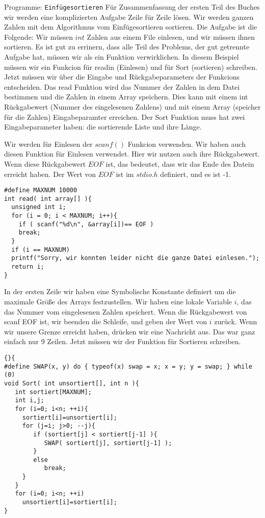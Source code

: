 \begin{myexampleprogram}{ Programme: \texttt{Einfügesortieren}}
Für Zusammenfassung der ersten Teil des Buches wir werden eine komplizierten Aufgabe Zeile für Zeile lösen.
Wir werden ganzen Zahlen mit dem Algorithmus vom Einfügesortieren sortieren. Die Aufgabe ist die Folgende:
Wir müssen $int$ Zahlen aus einem File einlesen, und wir müssen ihnen sortieren. Es ist gut zu errinern, 
dass alle Teil des Problems, der gut getrennte Aufgabe hat, müssen wir als ein Funktion verwirklichen.
In diesem Beispiel müssen wir ein Funkcion für readin (Einlesen) und für Sort (sortieren) schreiben.
Jetzt müssen wir über die Eingabe und Rückgabeparameters der Funkcions entscheiden.
Das read Funktion wird das Nummer der Zahlen in dem Datei bestimmen und die Zahlen in einem Array
speichern. Dies kann mit einem int Rückgabewert (Nummer des eingelesenen Zahlens) und mit einem Array
(speicher für die Zahlen) Eingabeparamter erreichen. Der Sort Funktion muss hat zwei Eingabeparameter haben:
die sortierende Liste und ihre Länge.

Wir werden für Einlesen der $scanf()$ Funkcion verwenden. Wir haben auch diesen Funktion für 
Einlesen verwendet. Hier wir nutzen auch ihre Rückgabewert. Wenn diese Rückgabewert $EOF$ ist, 
das bedeutet, dass wir das Ende des Datein erreicht haben. Der Wert von $EOF$ ist im $stdio.h$ definiert, 
und es ist -1.
\begin{lstlisting}
#define MAXNUM 10000
int read( int array[] ){
  unsigned int i;
  for (i = 0; i < MAXNUM; i++){
    if ( scanf("%d\n", &array[i])== EOF )
    break;
  }
  if (i == MAXNUM)
  printf("Sorry, wir konnten leider nicht die ganze Datei einlesen.");
  return i;
}
\end{lstlisting} 
In der ersten Zeile wir haben eine Symbolische Konstante definiert um die maximale Größe des
Arrays festzustellen. Wir haben eine lokale Variable $i$, das das Nummer vom eingelesenen Zahlen speichert.
Wenn die Rückgabewert von scanf EOF ist, wir beenden die Schleife, und geben der Wert von $i$ zurück.
Wenn wir unsere Grenze erreicht haben, drücken wir eine Nachricht aus.
Das war ganz einfach nur 9 Zeilen. Jetzt müssen wir der Funktion für Sortieren schreiben.
\begin{lstlisting}{}{
#define SWAP(x, y) do { typeof(x) swap = x; x = y; y = swap; } while (0)
void Sort( int unsortiert[], int n ){
   int sortiert[MAXNUM];
   int i,j;
   for (i=0; i<n; ++i){
     sortiert[i]=unsortiert[i];
     for (j=i; j>0; --j){
        if (sortiert[j] < sortiert[j-1] ){
           SWAP( sortiert[j], sortiert[j-1] );
        }
        else
           break;
     }
   }
   for (i=0; i<n; ++i)
     unsortiert[i]=sortiert[i];
}
\end{lstlisting}


\end{myexampleprogram}
